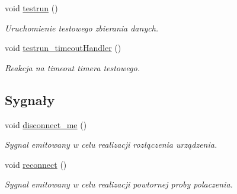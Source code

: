 \begin{DoxyCompactItemize}
void \hyperlink{class_main_window_ad15f695d0fd5b0beda1480517cfb0b86}{testrun} ()
\begin{DoxyCompactList}\small\item\em Uruchomienie testowego zbierania danych. \end{DoxyCompactList}\item 
void \hyperlink{class_main_window_a9d9abd7a1b1373c715d72c2205088cd3}{testrun\+\_\+timeout\+Handler} ()
\begin{DoxyCompactList}\small\item\em Reakcja na timeout timera testowego. \end{DoxyCompactList}\end{DoxyCompactItemize}
\subsection*{Sygnały}
\begin{DoxyCompactItemize}
\item 
void \hyperlink{class_main_window_a788aec3f41100b2834e290ad1ebb560c}{disconnect\+\_\+me} ()
\begin{DoxyCompactList}\small\item\em Sygnal emitowany w celu realizacji rozłączenia urządzenia. \end{DoxyCompactList}\item 
void \hyperlink{class_main_window_a4ade9bb2a578a8c031b1c0c439771f46}{reconnect} ()
\begin{DoxyCompactList}\small\item\em Sygnal emitowany w celu realizacji powtornej proby polaczenia. \end{DoxyCompactList}\end{DoxyCompactItemize}
